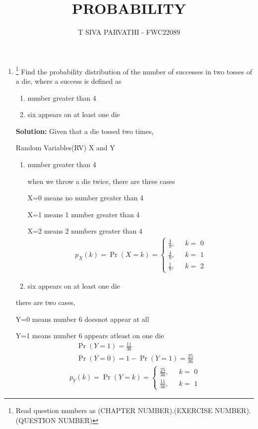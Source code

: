 \documentclass{article}
\providecommand{\pr}[1]{\ensuremath{\Pr\left(#1\right)}}
\newcommand{\solution}{\noindent \textbf{Solution: }}
\begin{document}
\title{PROBABILITY}
\author{\Large T SIVA PARVATHI - FWC22089}
\date{}

\maketitle
\begin{enumerate}[label=13.\arabic{enumi}.\arabic{enumii}]%
\setcounter{enumi}{3}
\setcounter{enumii}{5}

\item \footnote{Read question numbers as (CHAPTER NUMBER).(EXERCISE NUMBER).(QUESTION NUMBER)}
Find the probability distribution of the number of successes in two tosses of a die, where a success is defined as
\begin{enumerate}
\item number greater than 4
\item six appears on at least one die
\end{enumerate}

\solution
Given that a die tossed two times,
\begin{table}[h]\centering
	
	 \caption{Random Variables(RV) X and Y}\label{table:1}
\end{table}

\begin{enumerate}
\item number greater than 4

when we throw a die twice, there are three cases

X=0 means no number greater than 4

X=1 means 1 number greater than 4 

X=2 means 2 numbers greater than 4 
\begin{align}
  p_X(k) = \pr{X=k} =
    \begin{cases}
      \frac{4}{9},  & \text{ $k =$ 0}\\
      \frac{4}{9}, & \text{  $k =$ 1}\\
      \frac{1}{9}, & \text{  $k =$ 2}
    \end{cases}       
\end{align}
\item six appears on at least one die
\end{enumerate}

there are two cases,

Y=0 means number 6 doesnot appear at all 

Y=1 means number 6 appears atleast on one die 
\begin{align}
\pr{Y=1}=\frac{11}{36}\\
\pr{Y=0}=1-\pr{Y=1}=\frac{25}{36}
\end{align}
\begin{align}
  p_Y(k) = \pr{Y=k} =
    \begin{cases}
      \frac{25}{36},  & \text{ $k =$ 0}\\
      \frac{11}{36}, & \text{  $k =$ 1}
    \end{cases}       
\end{align}
\end{enumerate}
\end{document}
